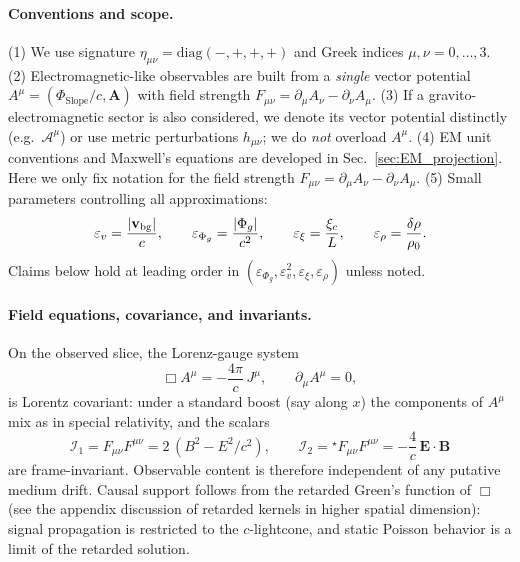 \paragraph{Conventions and scope.}
(1) We use signature $\eta_{\mu\nu}=\mathrm{diag}(-,+,+,+)$ and Greek indices $\mu,\nu=0,\dots,3$.
(2) Electromagnetic-like observables are built from a \emph{single} vector potential $A^\mu=(\Phi_{\text{Slope}}/c,\mathbf A)$ with field strength $F_{\mu\nu}=\partial_\mu A_\nu-\partial_\nu A_\mu$.
(3) If a gravito-electromagnetic sector is also considered, we denote its vector potential distinctly (e.g.\ $\mathcal A^\mu$) or use metric perturbations $h_{\mu\nu}$; we do \emph{not} overload $A^\mu$.
(4) EM unit conventions and Maxwell’s equations are developed in Sec.~\ref{sec:EM_projection}. Here we only fix notation for the field strength $F_{\mu\nu}=\partial_\mu A_\nu-\partial_\nu A_\mu$.
(5) Small parameters controlling all approximations:
\begin{equation}
\varepsilon_v=\frac{|\mathbf v_{\rm bg}|}{c},\qquad
\varepsilon_{\Phi_g}=\frac{|\Phi_g|}{c^2},\qquad
\varepsilon_\xi=\frac{\xi_c}{L},\qquad
\varepsilon_\rho=\frac{\delta\rho}{\rho_0}.
\end{equation}
Claims below hold at leading order in $(\varepsilon_{\Phi_g},\varepsilon_v^2,\varepsilon_\xi,\varepsilon_\rho)$ unless noted.

\paragraph{Field equations, covariance, and invariants.}
On the observed slice, the Lorenz-gauge system
\begin{equation}
\Box A^\mu = -\frac{4\pi}{c}\,J^\mu,\qquad \partial_\mu A^\mu=0,
\end{equation}
is Lorentz covariant: under a standard boost (say along $x$) the components of $A^\mu$ mix as in special relativity, and the scalars
\begin{equation}
\mathcal I_1 = F_{\mu\nu}F^{\mu\nu}=2\,(B^2-E^2/c^2),\qquad
\mathcal I_2 = {}^\star\!F_{\mu\nu}F^{\mu\nu}=-\frac{4}{c}\,\mathbf E\cdot\mathbf B
\end{equation}
are frame-invariant. Observable content is therefore independent of any putative medium drift. Causal support follows from the retarded Green's function of $\Box$ (see the appendix discussion of retarded kernels in higher spatial dimension): signal propagation is restricted to the $c$-lightcone, and static Poisson behavior is a limit of the retarded solution.

